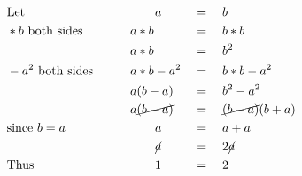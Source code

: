 \begin{alignat*}{3}
&\mathrm{Let}&&\qquad a&&=\quad b\\
&*b~\mathrm{both~sides}&&a*b&&=\quad b*b\\
&\,&&a*b&&=\quad b^2\\
&-a^2~\mathrm{both~sides}\qquad&& a*b-a^2&&=\quad b*b-a^2\\
&\,&&a(b-a)&&=\quad b^2-a^2\\
&\,&&a\cancel{(b-a)}&&=\quad\cancel{(b-a)}(b+a)\\
&\mathrm{since}~b=a&&\qquad a&&=\quad a+a\\
&\,&&\qquad\cancel{a}&&=\quad2\cancel{a}\\
&\mathrm{Thus}&&\qquad1&&=\quad2
\end{alignat*}
